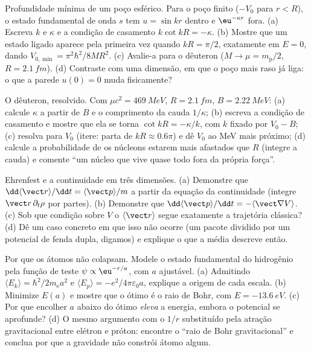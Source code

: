\begin{exercise}[$\star\star$]\label{exo:b3:schrodinger-three-dimensions:9}
Profundidade mínima de um poço esférico. Para o poço finito ($-V_0$
para $r < R$), o estado fundamental de onda $s$ tem $u = \sin kr$
dentro e $\eu^{-\kappa r}$ fora. (a) Escreva $k$ e $\kappa$ e a
condição de casamento $k\cot kR = -\kappa$. (b) Mostre que um estado
ligado aparece pela primeira vez quando $kR = \pi/2$, exatamente em
$E = 0$, dando $V_{0,\min} = \pi^2\hbar^2/8MR^2$. (c) Avalie-a para o
dêuteron ($M \to \mu = m_{\text{p}}/2$, $R = \qty{2.1}{fm}$). (d)
Contraste com uma dimensão, em que o poço mais raso já liga: o que a
parede $u(0) = 0$ muda fisicamente?
\end{exercise}

\begin{exercise}[$\star\star\star$]\label{exo:b3:schrodinger-three-dimensions:10}
O dêuteron, resolvido. Com $\mu c^2 = \qty{469}{MeV}$, $R =
\qty{2.1}{fm}$, $B = \qty{2.22}{MeV}$: (a) calcule $\kappa$ a partir de
$B$ e o comprimento da cauda $1/\kappa$; (b) escreva a condição de
casamento e mostre que ela se torna $\cot kR = -\kappa/k$, com $k$
fixado por $V_0 - B$; (c) resolva para $V_0$ (itere: parta de
$kR \approx 0.6\pi$) e dê $V_0$ ao MeV mais próximo; (d) calcule a
probabilidade de os núcleons estarem mais afastados que $R$ (integre a
cauda) e comente ``um núcleo que vive quase todo fora da própria
força''.
\end{exercise}

\begin{exercise}[$\star\star\star$]\label{exo:b3:schrodinger-three-dimensions:11}
Ehrenfest e a continuidade em três dimensões. (a) Demonstre que
$\dd\langle\vect r\rangle/\dd t = \langle\vect p\rangle/m$ a partir da
equação da continuidade (integre $\vect r\,\partial_t\rho$ por partes).
(b) Demonstre que $\dd\langle\vect p\rangle/\dd t =
-\langle\vect\nabla V\rangle$. (c) Sob que condição sobre $V$ o
$\langle\vect r\rangle$ segue exatamente a trajetória clássica? (d)
Dê um caso concreto em que isso não ocorre (um pacote dividido por um
potencial de fenda dupla, digamos) e explique o que a média descreve
então.
\end{exercise}

\begin{exercise}[$\star\star\star$]\label{exo:b3:schrodinger-three-dimensions:12}
Por que os átomos não colapsam. Modele o estado fundamental do
hidrogênio pela função de teste $\psi \propto \eu^{-r/a}$, com $a$
ajustável. (a) Admitindo $\langle E_k\rangle = \hbar^2/2m_{\text{e}}a^2$
e $\langle E_p\rangle = -e^2/4\pi\varepsilon_0a$, explique a origem de
cada escala. (b) Minimize $E(a)$ e mostre que o ótimo é o raio de Bohr,
com $E = \qty{-13.6}{eV}$. (c) Por que encolher $a$ abaixo do ótimo
\emph{eleva} a energia, embora o potencial se aprofunde? (d) O mesmo
argumento com o $1/r$ substituído pela atração gravitacional entre
elétron e próton: encontre o ``raio de Bohr gravitacional'' e conclua
por que a gravidade não constrói átomo algum.
\end{exercise}

